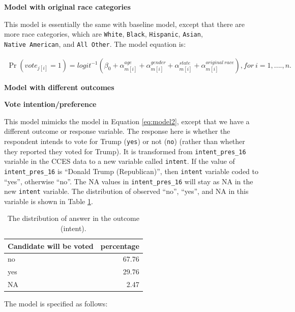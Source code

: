 \documentclass{monashthesis}
\begin{document}
\vspace{\baselineskip}

\textbf{Model with original race categories}

This model is essentially the same with baseline model, except that there are more race categories, which are \texttt{White}, \texttt{Black}, \texttt{Hispanic}, \texttt{Asian}, \texttt{Native\ American}, and \texttt{All\ Other}. The model equation is:

\begin{equation} 
\begin{split}
\Pr(vote_{j[i]} = 1) = logit^{-1}\left(\beta_0 + \alpha^{age}_{m[i]} + \alpha^{gender}_{m[i]} + \alpha^{state}_{m[i]} + \alpha^{original\ race}_{m[i]}\right), for\ i = 1, ...., n.
\end{split}
\label{eq:model3}
\end{equation}

\textbf{Model with different outcomes}

\textbf{Vote intention/preference}

This model mimicks the model in Equation \eqref{eq:model2}, except that we have a different outcome or response variable. The response here is whether the respondent intends to vote for Trump (\texttt{yes}) or not (\texttt{no}) (rather than whether they reported they voted for Trump). It is transformed from \texttt{intent\_pres\_16} variable in the CCES data to a new variable called \texttt{intent}. If the value of \texttt{intent\_pres\_16} is ``Donald Trump (Republican)'', then \texttt{intent} variable coded to ``yes'', otherwise ``no''. The NA values in \texttt{intent\_pres\_16} will stay as NA in the new \texttt{intent} variable. The distribution of observed ``no'', ``yes'', and NA in this variable is shown in Table \ref{tab:intent-dist}.

\begin{table}

\caption{\label{tab:intent-dist}The distribution of answer in the outcome (intent).}
\centering
\begin{tabular}[t]{lr}
\toprule
Candidate will be voted & percentage\\
\midrule
no & 67.76\\
yes & 29.76\\
NA & 2.47\\
\bottomrule
\end{tabular}
\end{table}

The model is specified as follows:
\end{document}
